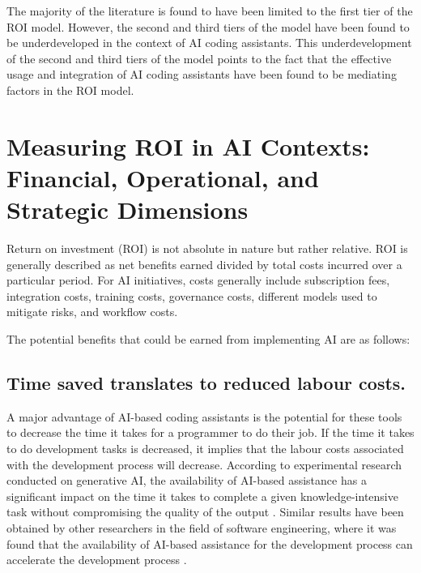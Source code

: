 The majority of the literature is found to have been limited to the first tier of the ROI model. However, the second and third tiers of the model have been found to be underdeveloped in the context of AI coding assistants. This underdevelopment of the second and third tiers of the model points to the fact that the effective usage and integration of AI coding assistants have been found to be mediating factors in the ROI model.	


\section{Measuring ROI in AI Contexts: Financial, Operational, and Strategic Dimensions}
\label{sec:Measuring ROI in AI Contexts: Financial, Operational, and Strategic Dimensions}
Return on investment (ROI) is not absolute in nature but rather relative. ROI is generally described as net benefits earned divided by total costs incurred over a particular period. For AI initiatives, costs generally include subscription fees, integration costs, training costs, governance costs, different models used to mitigate risks, and workflow costs. 

The potential benefits that could be earned from implementing AI are as follows: 
\subsection {Time saved translates to reduced labour costs.}
\label{sec:Time saved translates to reduced labour costs}
A major advantage of AI-based coding assistants is the potential for these tools to decrease the time it takes for a programmer to do their job. If the time it takes to do development tasks is decreased, it implies that the labour costs associated with the development process will decrease. According to experimental research conducted on generative AI, the availability of AI-based assistance has a significant impact on the time it takes to complete a given knowledge-intensive task without compromising the quality of the output \autocite{Noy2023}. Similar results have been obtained by other researchers in the field of software engineering, where it was found that the availability of AI-based assistance for the development process can accelerate the development process \autocite{Peng2023}.

